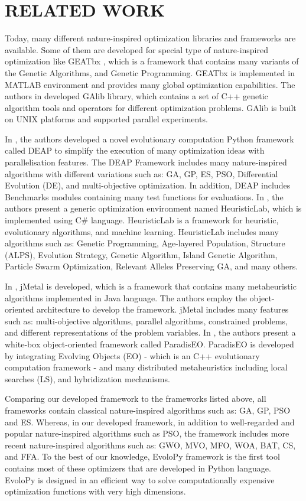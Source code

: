 \documentclass[a4paper,twoside]{article}
\begin{document}
\section{\uppercase{Related Work}}
Today, many different nature-inspired optimization libraries and frameworks are available. Some of them are developed for special type of nature-inspired optimization like GEATbx \cite{GEATbx}, which is a framework that contains many variants of the Genetic Algorithms, and Genetic Programming. GEATbx is implemented in MATLAB environment and provides many global optimization capabilities. The authors in \cite {GAlib} developed GAlib library, which contains a set of C++ genetic algorithm tools and operators for different optimization problems. GAlib is built on UNIX platforms and supported parallel experiments. 

In \cite {DEAP_JMLR2012}, the authors developed a novel evolutionary computation Python framework called DEAP to simplify the execution of many optimization ideas with  parallelisation features. The DEAP Framework includes many nature-inspired algorithms with different variations such as: GA, GP, ES, PSO, Differential Evolution (DE), and multi-objective optimization. In addition, DEAP includes Benchmarks modules containing many test functions for evaluations. In \cite{Wagner04}, the authors present a generic optimization environment named HeuristicLab, which is implemented using C\# language. HeuristicLab is a framework for heuristic, evolutionary algorithms, and machine learning. HeuristicLab includes many algorithms such as: Genetic Programming, Age-layered Population, Structure (ALPS), Evolution Strategy, Genetic Algorithm, Island Genetic Algorithm, Particle Swarm Optimization, Relevant Alleles Preserving GA, and many others. 

In \cite{Durillo2011}, jMetal is developed, which is a framework that contains many metaheuristic algorithms implemented in Java language. The authors employ the object-oriented architecture to develop the framework. jMetal includes many features such as: multi-objective algorithms, parallel algorithms, constrained problems, and different representations of the problem variables. In \cite{Cahon2004,humeau13}, the authors present a white-box object-oriented framework called ParadisEO. ParadisEO is developed by integrating Evolving Objects (EO) - which is an C++ evolutionary computation framework - and many distributed metaheuristics including local searches (LS), and hybridization mechanisms.  

Comparing our developed framework to the frameworks listed above, all
frameworks contain classical nature-inspired algorithms such as: GA,
GP, PSO and ES. Whereas, in our developed framework, in addition to
well-regarded and popular nature-inspired algorithms such as PSO, the
framework includes more recent nature-inspired algorithms such as:
GWO, MVO, MFO, WOA, BAT, CS, and FFA. To the best of our knowledge,
EvoloPy framework is the first tool contains most of these optimizers that are
developed in Python language. EvoloPy is designed in an efficient way
to solve computationally expensive optimization functions with very
high dimensions. 
\end{document}
